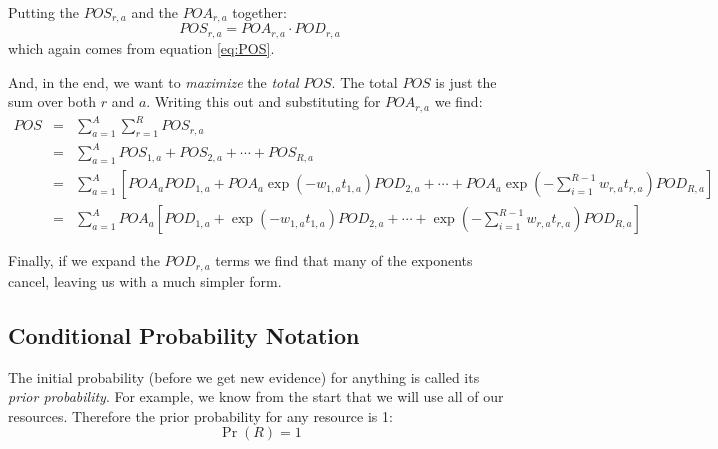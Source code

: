 Putting the $POS_{r,a}$ and the $POA_{r,a}$ together:
\begin{equation}
  \label{eq:POS2_ra}
  POS_{r,a} = POA_{r,a} \cdot POD_{r,a}
\end{equation}
which again comes from equation \ref{eq:POS}. 

And, in the end, we want to \emph{maximize} the \emph{total}
$POS$. The total $POS$ is just the sum over both $r$ and $a$. Writing
this out and substituting for $POA_{r,a}$ we find:
\begin{eqnarray}
  \label{eq:POS_tot}
  POS &=& \sum_{a=1}^A \sum_{r=1}^R POS_{r,a}\\
  \nonumber &=& \sum_{a=1}^A POS_{1,a} + POS_{2,a} + \cdots + POS_{R,a}\\
  \nonumber &=& \sum_{a=1}^A \left[
    POA_a POD_{1,a} +
    POA_a \exp(-w_{1,a}t_{1,a}) POD_{2,a} + \cdots + 
    POA_a \exp\left(-\sum_{i=1}^{R-1}w_{r,a}t_{r,a}\right) POD_{R,a} 
    \right]\\
   &=& \sum_{a=1}^A POA_a \left[
     POD_{1,a} +
     \exp(-w_{1,a}t_{1,a}) POD_{2,a}+ \cdots + 
     \exp\left(-\sum_{i=1}^{R-1}w_{r,a}t_{r,a}\right) POD_{R,a}
     \right]
\end{eqnarray}

Finally, if we expand the $POD_{r,a}$ terms we find that many of the
exponents cancel, leaving us with a much simpler form.


\subsection{Conditional Probability Notation}
\label{sec:Cond-Prob-Notat}

The initial probability (before we get new evidence) for anything is
called its \emph{prior probability}. For example, we know from the
start that we will use all of our resources. Therefore the prior
probability for any resource is 1:
\begin{equation}
  \label{eq:p(r)}
  \Pr(R) = 1
\end{equation}

